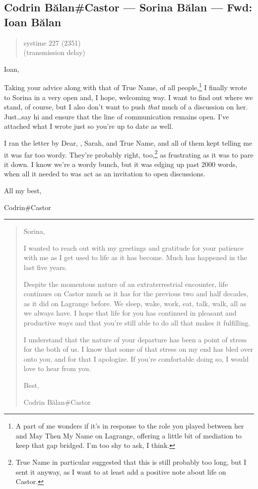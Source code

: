 \hypertarget{codrin-bux103lancastor-sorina-bux103lan-fwd-ioan-bux103lan}{%
\subsection{Codrin Bălan\#Castor — Sorina Bălan — Fwd: Ioan Bălan}\label{codrin-bux103lancastor-sorina-bux103lan-fwd-ioan-bux103lan}}

\begin{quote}
systime 227 (2351)\\
(transmission delay)
\end{quote}

Ioan,

Taking your advice along with that of True Name, of all people,\footnote{A part of me wonders if it's in response to the role you played between her and May Then My Name on Lagrange, offering a little bit of mediation to keep that gap bridged. I'm too shy to ask, I think.} I finally wrote to Sorina in a very open and, I hope, welcoming way. I want to find out where we stand, of course, but I also don't want to push \emph{that} much of a discussion on her. Just\ldots say hi and ensure that the line of communication remains open. I've attached what I wrote just so you're up to date as well.

I ran the letter by Dear, \Partner , Sarah, and True Name, and all of them kept telling me it was far too wordy. They're probably right, too,\footnote{True Name in particular suggested that this is still probably too long, but I sent it anyway, as I want to at least add a positive note about life on Castor.} as frustrating as it was to pare it down. I know we're a wordy bunch, but it was edging up past 2000 words, when all it needed to was act as an invitation to open discussions.

All my best,

Codrin\#Castor

\begin{center}\rule{0.5\linewidth}{0.5pt}\end{center}

\begin{quote}
Sorina,

I wanted to reach out with my greetings and gratitude for your patience with me as I get used to life as it has become. Much has happened in the last five years.

Despite the momentous nature of an extraterrestrial encounter, life continues on Castor much as it has for the previous two and half decades, as it did on Lagrange before. We sleep, wake, work, eat, talk, walk, all as we always have. I hope that life for you has continued in pleasant and productive ways and that you're still able to do all that makes it fulfilling.

I understand that the nature of your departure has been a point of stress for the both of us. I know that some of that stress on my end has bled over onto you, and for that I apologize. If you're comfortable doing so, I would love to hear from you.

Best,

Codrin Bălan\#Castor
\end{quote}
